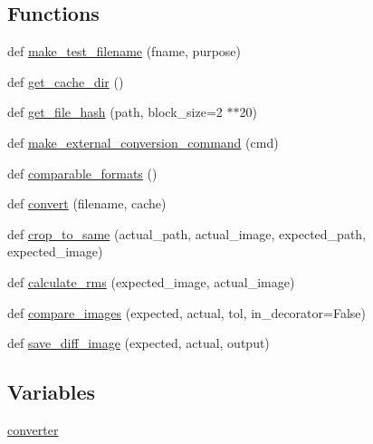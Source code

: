 \subsection*{Functions}
\begin{DoxyCompactItemize}
\item 
def \hyperlink{namespacematplotlib_1_1testing_1_1compare_af2961b8f2b91f72b4634b876fe39f41f}{make\+\_\+test\+\_\+filename} (fname, purpose)
\item 
def \hyperlink{namespacematplotlib_1_1testing_1_1compare_a1996334d8a1c816f484bb22504a74b33}{get\+\_\+cache\+\_\+dir} ()
\item 
def \hyperlink{namespacematplotlib_1_1testing_1_1compare_a5f24669dccb05c0f33e0efc1f308857e}{get\+\_\+file\+\_\+hash} (path, block\+\_\+size=2 $\ast$$\ast$20)
\item 
def \hyperlink{namespacematplotlib_1_1testing_1_1compare_a28850cf5cd8dfc3495aa3ef20791c882}{make\+\_\+external\+\_\+conversion\+\_\+command} (cmd)
\item 
def \hyperlink{namespacematplotlib_1_1testing_1_1compare_af7dc5b0b19a6b50cca0100898c47bc2b}{comparable\+\_\+formats} ()
\item 
def \hyperlink{namespacematplotlib_1_1testing_1_1compare_afbe684c21fe258bb99af64ddb97623bf}{convert} (filename, cache)
\item 
def \hyperlink{namespacematplotlib_1_1testing_1_1compare_a90cba8809a5706e2c0b31a908de4924d}{crop\+\_\+to\+\_\+same} (actual\+\_\+path, actual\+\_\+image, expected\+\_\+path, expected\+\_\+image)
\item 
def \hyperlink{namespacematplotlib_1_1testing_1_1compare_a2037ee97b13d2baa4e243a239dda5ce3}{calculate\+\_\+rms} (expected\+\_\+image, actual\+\_\+image)
\item 
def \hyperlink{namespacematplotlib_1_1testing_1_1compare_a099a97a667c7cf9e562db6717243fb76}{compare\+\_\+images} (expected, actual, tol, in\+\_\+decorator=False)
\item 
def \hyperlink{namespacematplotlib_1_1testing_1_1compare_ab116a8a80cb7cbb6705b679fc2ba6b6b}{save\+\_\+diff\+\_\+image} (expected, actual, output)
\end{DoxyCompactItemize}
\subsection*{Variables}
\begin{DoxyCompactItemize}
\item 
\hyperlink{namespacematplotlib_1_1testing_1_1compare_af172c07fb213547199bf93cd4ca94f6c}{converter}
\end{DoxyCompactItemize}


